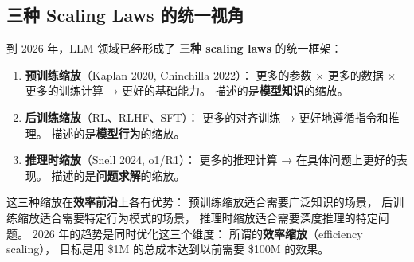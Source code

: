 \subsection{三种 Scaling Laws 的统一视角}

到 2026 年，LLM 领域已经形成了
\textbf{三种 scaling laws} 的统一框架：

\begin{enumerate}[noitemsep]
  \item \textbf{预训练缩放}（Kaplan 2020, Chinchilla 2022）：
        更多的参数 $\times$ 更多的数据 $\times$ 更多的训练计算
        → 更好的基础能力。
        描述的是\textbf{模型知识}的缩放。
  \item \textbf{后训练缩放}（RL、RLHF、SFT）：
        更多的对齐训练 → 更好地遵循指令和推理。
        描述的是\textbf{模型行为}的缩放。
  \item \textbf{推理时缩放}（Snell 2024, o1/R1）：
        更多的推理计算 → 在具体问题上更好的表现。
        描述的是\textbf{问题求解}的缩放。
\end{enumerate}

这三种缩放在\textbf{效率前沿}上各有优势：
预训练缩放适合需要广泛知识的场景，
后训练缩放适合需要特定行为模式的场景，
推理时缩放适合需要深度推理的特定问题。
2026 年的趋势是同时优化这三个维度：
所谓的\textbf{效率缩放}（efficiency scaling），
目标是用 \$1M 的总成本达到以前需要 \$100M 的效果。

